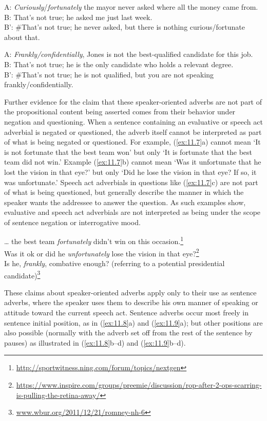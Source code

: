 \ea \label{ex:11.5}
A: \textit{Curiously}/\textit{fortunately} the mayor never asked where all the money came from.\\
B: That’s not true; he asked me just last week.\\
B': \#That’s not true; he never asked, but there is nothing curious/fortunate about that.
\z

\ea \label{ex:11.6}
A: \textit{Frankly/confidentially}, Jones is not the best-qualified candidate for this job.\\
B: That’s not true; he is the only candidate who holds a relevant degree.\\
B': \#That’s not true; he is not qualified, but you are not speaking frankly/confidentially.
\z


Further evidence for the claim that these speaker-oriented adverbs are not part of the propositional content being asserted comes from their behavior under negation and questioning. When a sentence containing an evaluative or speech act adverbial is negated or questioned, the adverb itself cannot be interpreted as part of what is being negated or questioned. For example, (\ref{ex:11.7}a) cannot mean ‘It is not fortunate that the best team won’ but only ‘It is fortunate that the best team did not win.’ Example (\ref{ex:11.7}b) cannot mean ‘Was it unfortunate that he lost the vision in that eye?’ but only ‘Did he lose the vision in that eye? If so, it was unfortunate.’ Speech act adverbials in questions like (\ref{ex:11.7}c) are not part of what is being questioned, but generally describe the manner in which the speaker wants the addressee to answer the question. As such examples show, evaluative and speech act adverbials are not interpreted as being under the scope of sentence negation or interrogative mood.


\ea \label{ex:11.7}
\ea  … the best team \textit{fortunately} didn’t win on this occasion.\footnote{\url{http://sportwitness.ning.com/forum/topics/nextgen}} \\
\ex Was it ok or did he \textit{unfortunately} lose the vision in that eye?\footnote{\url{https://www.inspire.com/groups/preemie/discussion/rop-after-2-ops-scarring-is-pulling-the-retina-away/}} \\
\ex Is he, \textit{frankly}, combative enough? (referring to a potential presidential candidate)\footnote{\href{http://www.wbur.org/2011/12/21/romney-nh-6}{{www.wbur.org/2011/12/21/romney-nh-6}}} 
                       \z
\z


These claims about speaker-oriented adverbs apply only to their use as sentence adverbs, where the speaker uses them to describe his own manner of speaking or attitude toward the current speech act. Sentence adverbs occur most freely in sentence initial position, as in (\ref{ex:11.8}a) and (\ref{ex:11.9}a); but other positions are also possible (normally with the adverb set off from the rest of the sentence by pauses) as illustrated in (\ref{ex:11.8}b--d) and (\ref{ex:11.9}b--d).


